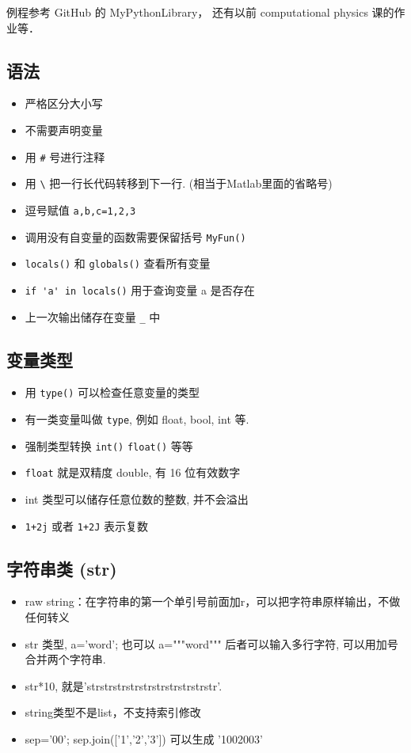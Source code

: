 
\begin{issues}
\issueDraft
\end{issues}

例程参考 GitHub 的 MyPythonLibrary， 还有以前 computational physics 课的作业等．

\subsection{语法}
\begin{itemize}
\item 严格区分大小写
\item 不需要声明变量
\item 用 \verb|#| 号进行注释
\item 用 \verb|\| 把一行长代码转移到下一行. (相当于Matlab里面的省略号)
\item 逗号赋值 \verb`a,b,c=1,2,3`
\item 调用没有自变量的函数需要保留括号  \verb`MyFun()`
\item \verb`locals()` 和 \verb`globals()` 查看所有变量
\item \verb`if 'a' in locals()` 用于查询变量 a 是否存在
\item 上一次输出储存在变量 \verb`_` 中
\end{itemize}

\subsection{变量类型}
\begin{itemize}
\item 用 \verb`type()` 可以检查任意变量的类型
\item 有一类变量叫做 \verb`type`, 例如 float, bool, int 等.
\item 强制类型转换 \verb`int()` \verb`float()` 等等
\item \verb`float` 就是双精度 double, 有 16 位有效数字
\item int 类型可以储存任意位数的整数, 并不会溢出 
\item \verb`1+2j` 或者 \verb`1+2J` 表示复数
\end{itemize}

\subsection{字符串类 (str)}
\begin{itemize}
\item raw string：在字符串的第一个单引号前面加r，可以把字符串原样输出，不做任何转义
\item str 类型, a='word'; 也可以 a="""word""" 后者可以输入多行字符, 可以用加号合并两个字符串.
\item str*10, 就是'strstrstrstrstrstrstrstrstrstr'.
\item string类型不是list，不支持索引修改
\item sep='00'; sep.join(['1','2','3']) 可以生成 '1002003'
\end{itemize}

